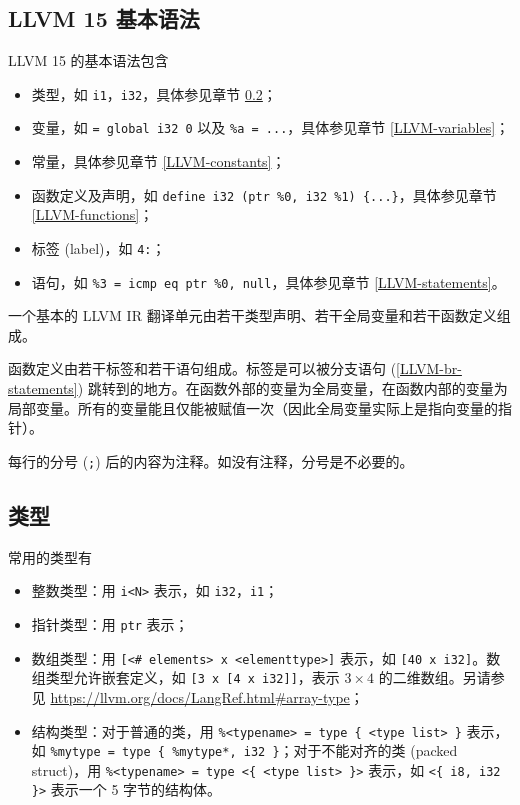 \subsection{LLVM 15 基本语法}

LLVM 15 的基本语法包含
\begin{itemize}
  \item 类型，如 \texttt{i1}，\texttt{i32}，具体参见章节 \ref{LLVM-types}；
  \item 变量，如 \texttt{\@a = global i32 0} 以及
    \texttt{\%a = ...}，具体参见章节 \ref{LLVM-variables}；
  \item 常量，具体参见章节 \ref{LLVM-constants}；
  \item 函数定义及声明，如 \texttt{define i32 \@foo(ptr \%0, i32 \%1) \{...\}}，具体参见章节
    \ref{LLVM-functions}；
  \item 标签 (label)，如 \texttt{4:}；
  \item 语句，如 \texttt{\%3 = icmp eq ptr \%0, null}，具体参见章节
    \ref{LLVM-statements}。
\end{itemize}

一个基本的 LLVM IR 翻译单元由若干类型声明、若干全局变量和若干函数定义组成。

函数定义由若干标签和若干语句组成。标签是可以被分支语句 (\ref{LLVM-br-statements})
跳转到的地方。在函数外部的变量为全局变量，在函数内部的变量为局部变量。所有的变量能且仅能被赋值一次（因此全局变量实际上是指向变量的指针）。

每行的分号 (\texttt{;}) 后的内容为注释。如没有注释，分号是不必要的。

\subsection{类型}\label{LLVM-types}

常用的类型有
\begin{itemize}
  \item 整数类型：用 \texttt{i<N>} 表示，如 \texttt{i32}，\texttt{i1}；
  \item 指针类型：用 \texttt{ptr} 表示；
  \item 数组类型：用 \texttt{[<\# elements> x <elementtype>]} 表示，如
    \texttt{[40 x i32]}。数组类型允许嵌套定义，如
    \texttt{[3 x [4 x i32]]}，表示 $3\times 4$ 的二维数组。另请参见
    \url{https://llvm.org/docs/LangRef.html#array-type}；
  \item 结构类型：对于普通的类，用 \texttt{\%<typename> = type \{ <type list> \}} 表示，如
    \texttt{\%mytype = type \{ \%mytype*, i32 \}}；对于不能对齐的类
    (packed struct)，用 \texttt{\%<typename> = type <\{ <type list> \}>}
    表示，如 \texttt{<\{ i8, i32 \}>} 表示一个 5 字节的结构体。
\end{itemize}

